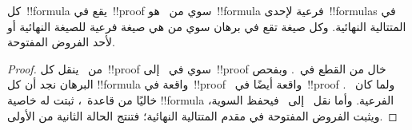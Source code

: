 \documentclass[../../../include/open-logic-section]{subfiles}
\begin{document}
\begin{cor}
كل~!!{formula} يقع في~!!{proof} سوي من~ هو~!!{formula} فرعية
لإحدى~!!{formula}s في المتتالية النهائية. وكل صيغة تقع في برهان سوي من
 هي صيغة فرعية للصيغة النهائية أو لأحد الفروض المفتوحة.
\end{cor}

\begin{proof}
  من~ ينقل كل~!!{proof} سوي في~
  إلى~!!{proof} خال من القطع في~. وبفحص البرهان نجد أن كل
  !!{formula} واقعة في~!!{proof}~ واقعة أيضًا في~!!{proof}
  . ولما كان~ خاليًا من قاعدة~\Cut{}، ثبتت له خاصية
  !!{formula} الفرعية. وأما نقل~ إلى~ فيحفظ السوية،
  ويثبت الفروض المفتوحة في مقدم المتتالية النهائية؛ فتنتج الحالة الثانية
  من الأولى.
\end{proof}
\end{document}
